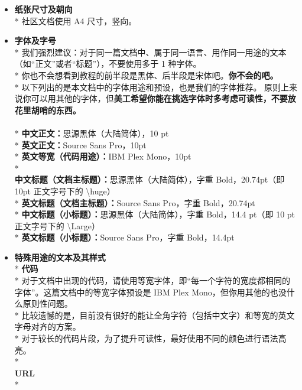     \begin{itemize}
        \item\textbf{\large{纸张尺寸及朝向}}\\*
        社区文档使用 A4 尺寸，竖向。
        \\
        \item\textbf{\large{字体及字号}}\\*
        我们强烈建议：对于同一篇文档中、属于同一语言、用作同一用途的文本（如“正文”或者“标题”），不要使用多于 1 种字体。\\*
        你也不会想看到教程的前半段是黑体、后半段是宋体吧。\textbf{你不会的吧。}\\*
        以下列出的是本文档中的字体用途和预设，也是我们的字体推荐。
        原则上来说你可以用其他的字体，但\textbf{美工希望你能在挑选字体时多考虑可读性，不要放花里胡哨的东西。}
        \\
        \\*
        \textbf{中文正文：}思源黑体（大陆简体），10 pt\\*
        \textbf{英文正文：}Source Sans Pro，10pt\\*
        \textbf{英文等宽（代码用途）：}\ttfamily IBM Plex Mono，10pt \rmfamily\\*
        \\
        \textbf{中文标题（文档主标题）：}思源黑体（大陆简体），字重 Bold，20.74pt（即 10pt 正文字号下的 \ttfamily\textbackslash{}huge\rmfamily ）\\*
        \textbf{英文标题（文档主标题）：}Source Sans Pro，字重 Bold，20.74pt\\*
        \textbf{中文标题（小标题）：}思源黑体（大陆简体），字重 Bold，14.4 pt（即 10 pt 正文字号下的 \ttfamily\textbackslash{}Large\rmfamily ）\\*
        \textbf{英文标题（小标题）：}Source Sans Pro，字重 Bold，14.4pt
        \\
        \item\textbf{\large{特殊用途的文本及其样式}}\\*
        \textbf{代码}\\*
        对于文档中出现的代码，请使用等宽字体，即“每一个字符的宽度都相同的字体”。这篇文档中的等宽字体预设是 IBM Plex Mono，但你用其他的也没什么原则性问题。\\*
        比较遗憾的是，目前没有很好的能让全角字符（包括中文字）和等宽的英文字母对齐的方案。\\*
        对于较长的代码片段，为了提升可读性，最好使用不同的颜色进行语法高亮。\\*
        \\
        \textbf{URL}\\*

    \end{itemize}    


